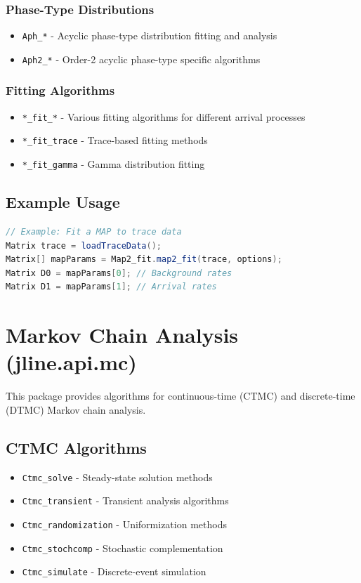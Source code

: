 \subsubsection{Phase-Type Distributions}
\begin{itemize}
\item \texttt{Aph\_*} - Acyclic phase-type distribution fitting and analysis
\item \texttt{Aph2\_*} - Order-2 acyclic phase-type specific algorithms
\end{itemize}

\subsubsection{Fitting Algorithms}
\begin{itemize}
\item \texttt{*\_fit\_*} - Various fitting algorithms for different arrival processes
\item \texttt{*\_fit\_trace} - Trace-based fitting methods
\item \texttt{*\_fit\_gamma} - Gamma distribution fitting
\end{itemize}

\subsection{Example Usage}
\begin{lstlisting}[language = java, basicstyle=\ttfamily\scriptsize]
// Example: Fit a MAP to trace data
Matrix trace = loadTraceData();
Matrix[] mapParams = Map2_fit.map2_fit(trace, options);
Matrix D0 = mapParams[0]; // Background rates
Matrix D1 = mapParams[1]; // Arrival rates
\end{lstlisting}

\section{Markov Chain Analysis (jline.api.mc)}

This package provides algorithms for continuous-time (CTMC) and discrete-time (DTMC) Markov chain analysis.

\subsection{CTMC Algorithms}
\begin{itemize}
\item \texttt{Ctmc\_solve} - Steady-state solution methods
\item \texttt{Ctmc\_transient} - Transient analysis algorithms  
\item \texttt{Ctmc\_randomization} - Uniformization methods
\item \texttt{Ctmc\_stochcomp} - Stochastic complementation
\item \texttt{Ctmc\_simulate} - Discrete-event simulation
\end{itemize}

